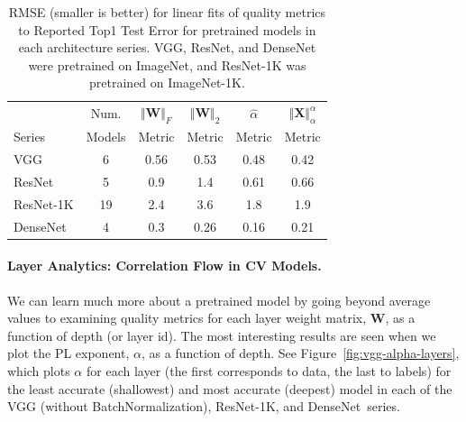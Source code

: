\begin{table}[t]
\small
\begin{center}
\begin{tabular}{|p{0.75in}|c|c|c|c|c|}
\hline
        & Num.   & $\Vert\mathbf{W}\Vert_{F}$ & $\Vert\mathbf{W}\Vert_{2}$ & $\hat{\alpha}$ & $\Vert\mathbf{X}\Vert^{\alpha}_{\alpha}$ \\
 Series & Models & Metric                     & Metric                     & Metric         & Metric                                   \\
\hline
 VGG & 6 & 0.56 & 0.53 & 0.48 & 0.42  \\
 ResNet & 5 & 0.9 & 1.4 & 0.61 & 0.66  \\
 ResNet-1K & 19 & 2.4 & 3.6 & 1.8 & 1.9  \\
 DenseNet & 4 & 0.3 & 0.26 & 0.16 & 0.21 \\
\hline
\end{tabular}
\end{center}
\caption{RMSE (smaller is better) for linear fits of quality metrics to Reported Top1 Test Error for pretrained models in each architecture series.  VGG, ResNet, and DenseNet were pretrained on ImageNet, and ResNet-1K was pretrained on ImageNet-1K. }
\label{table:cv-models}
\end{table}


\paragraph{Layer Analytics: Correlation Flow in CV Models.}

We can learn much more about a pretrained model by going beyond average values to examining quality metrics for each layer weight matrix, $\mathbf{W}$, as a function of depth (or layer id).  %
The most interesting results are seen when we plot the PL exponent, $\alpha$, as a function of depth.
%
See Figure~\ref{fig:vgg-alpha-layers}, which plots $\alpha$ for each layer (the first corresponds to data, the last to labels) for the least accurate (shallowest) and most accurate (deepest) model in each of the VGG (without BatchNormalization), ResNet-1K, and DenseNet~series.

